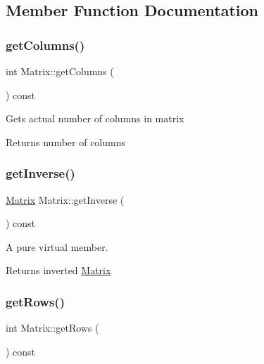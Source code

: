 \subsection{Member Function Documentation}
\mbox{\label{classMatrix_a37d08315d9b28e5922e1a75b4d2a4cb9}} 
\subsubsection{\texorpdfstring{get\+Columns()}{getColumns()}}
{\footnotesize\ttfamily int Matrix\+::get\+Columns (\begin{DoxyParamCaption}{ }\end{DoxyParamCaption}) const\hspace{0.3cm}{\ttfamily [inline]}}

Gets actual number of columns in matrix \begin{DoxyReturn}{Returns}
number of columns 
\end{DoxyReturn}
\mbox{\label{classMatrix_ade3fcddb0cc6a7e221a94e13afc7752c}} 
\subsubsection{\texorpdfstring{get\+Inverse()}{getInverse()}}
{\footnotesize\ttfamily \hyperlink{classMatrix}{Matrix} Matrix\+::get\+Inverse (\begin{DoxyParamCaption}{ }\end{DoxyParamCaption}) const}

A pure virtual member. \begin{DoxyReturn}{Returns}
inverted \hyperlink{classMatrix}{Matrix} 
\end{DoxyReturn}
\mbox{\label{classMatrix_ad1b2433d295efcbf371e6f636db757e9}} 
\subsubsection{\texorpdfstring{get\+Rows()}{getRows()}}
{\footnotesize\ttfamily int Matrix\+::get\+Rows (\begin{DoxyParamCaption}{ }\end{DoxyParamCaption}) const\hspace{0.3cm}{\ttfamily [inline]}}

